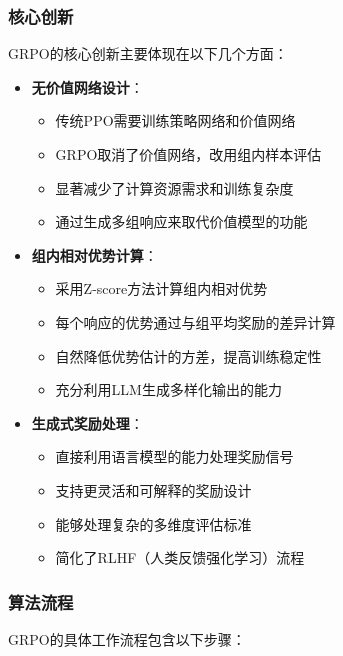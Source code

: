 \documentclass[a4paper, 12pt]{article}
\begin{document}
\subsubsection{核心创新}
GRPO的核心创新主要体现在以下几个方面：

\begin{itemize}
    \item \textbf{无价值网络设计}：
        \begin{itemize}
            \item 传统PPO需要训练策略网络和价值网络
            \item GRPO取消了价值网络，改用组内样本评估
            \item 显著减少了计算资源需求和训练复杂度
            \item 通过生成多组响应来取代价值模型的功能
        \end{itemize}
    
    \item \textbf{组内相对优势计算}：
        \begin{itemize}
            \item 采用Z-score方法计算组内相对优势
            \item 每个响应的优势通过与组平均奖励的差异计算
            \item 自然降低优势估计的方差，提高训练稳定性
            \item 充分利用LLM生成多样化输出的能力
        \end{itemize}
    
    \item \textbf{生成式奖励处理}：
        \begin{itemize}
            \item 直接利用语言模型的能力处理奖励信号
            \item 支持更灵活和可解释的奖励设计
            \item 能够处理复杂的多维度评估标准
            \item 简化了RLHF（人类反馈强化学习）流程
        \end{itemize}
\end{itemize}

\subsubsection{算法流程}
GRPO的具体工作流程包含以下步骤：
\end{document}
